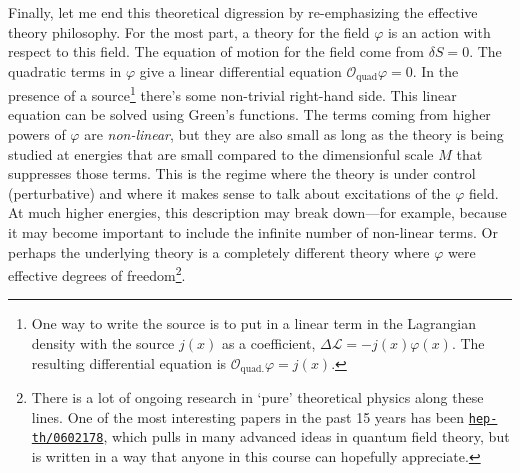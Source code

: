 Finally, let me end this theoretical digression by re-emphasizing the effective theory philosophy. For the most part, a theory for the field $\varphi$ is an action with respect to this field. The equation of motion for the field come from $\delta S = 0$. The quadratic terms in $\varphi$ give a linear differential equation $\mathcal O_\text{quad} \varphi = 0$. In the presence of a source\footnote{One way to write the source is to put in a linear term in the Lagrangian density with the source $j(x)$ as a coefficient, $\Delta\mathcal L = -j(x)\varphi(x)$. The resulting differential equation is $\mathcal O_\text{quad.}\varphi =j(x)$.} there's some non-trivial right-hand side. This linear equation can be solved using Green's functions. The terms coming from higher powers of $\varphi$ are \emph{non-linear}, but they are also small as long as the theory is being studied at energies that are small compared to the dimensionful scale $M$ that suppresses those terms. This is the regime where the theory is under control (perturbative) and where it makes sense to talk about excitations of the $\varphi$ field. At much higher energies, this description may break down---for example, because it may become important to include the infinite number of non-linear terms. Or perhaps the underlying theory is a completely different theory where $\varphi$ were effective degrees of freedom\footnote{There is a lot of ongoing research in `pure' theoretical physics along these lines. One of the most interesting papers in the past 15 years has been \texttt{\href{https://arxiv.org/abs/hep-th/0602178}{hep-th/0602178}}, which pulls in many advanced ideas in quantum field theory, but is written in a way that anyone in this course can hopefully appreciate.}.
